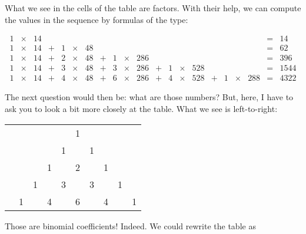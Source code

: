 \documentclass[tikz]{scrreprt}
\begin{document}
What we see in the cells of the table
are factors. With their help, we can compute
the values in the sequence by formulas of the type:

\begin{equation}
\begin{array}{rcrcrcrcrcrcrcrcrcrcr}
  1 & \times & 14 &   &   &        &    &   &   &        &     &   &   &        &     &   &   &        &     & = & 14\\
  1 & \times & 14 & + & 1 & \times & 48 &   &   &        &     &   &   &        &     &   &   &        &     & = & 62\\
  1 & \times & 14 & + & 2 & \times & 48 & + & 1 & \times & 286 &   &   &        &     &   &   &        &     & = & 396\\
  1 & \times & 14 & + & 3 & \times & 48 & + & 3 & \times & 286 & + & 1 & \times & 528 &   &   &        &     & = & 1544\\
  1 & \times & 14 & + & 4 & \times & 48 & + & 6 & \times & 286 & + & 4 & \times & 528 & + & 1 & \times & 288 & = & 4322
\end{array}
\end{equation}

The next question would then be: what are those numbers?
But, here, I have to ask you to look a bit more closely at the table.
What we see is left-to-right:

\begin{center}
\begin{tabular}{cccccccccc}
  &   &     &    &     & 1 &      &   &   &   \\
  &   &     &    &  1  &   &  1   &   &   &   \\
  &   &     &  1 &     & 2 &      & 1 &   &   \\
  &   &  1  &    &  3  &   &  3   &   & 1 &    \\
  & 1 &     & 4  &     & 6 &      & 4 &   & 1 
\end{tabular}
\end{center}

Those are binomial coefficients!
Indeed. We could rewrite the table as
\end{document}
